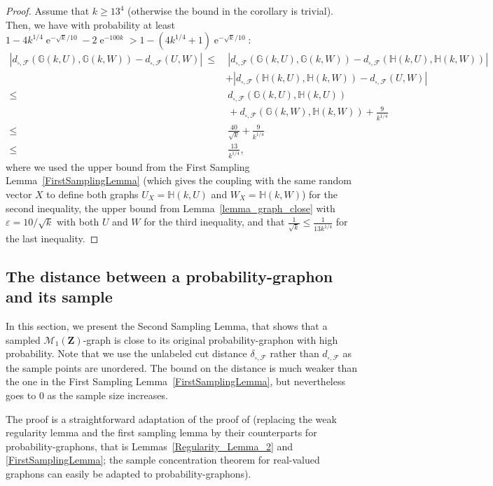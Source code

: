 \documentclass{amsart}
\theoremstyle{plain}
\theoremstyle{definition}
\newcommand{\Space}{\mathbf{Z}}
\newcommand{\bbH}{\mathbb{H}}
\newcommand{\Proba}{\mathcal{M}_1(\Space)}
\newcommand{\dcutF}{d_{\square,\mathcal{F}}}
\newcommand{\ddcutF}{\delta_{\square,\mathcal{F}}}
\newcommand{\eps}{\varepsilon}
\DeclareMathOperator{\e}{e}
\begin{document}
\begin{proof}
Assume that $k \geq 13^4$ (otherwise the bound in the corollary is trivial).
Then, we have with probability at least $1 - 4k^{1/4}\e^{-\sqrt{k}/10} - 2\e^{-100 k}
> 1 - (4k^{1/4}+1)\e^{-\sqrt{k}/10}$:
\begin{align}
\left| \dcutF(\mathbb{G}(k,U), \mathbb{G}(k,W)) - \dcutF(U,W) \right| 
\ \leq & \ \left| \dcutF(\mathbb{G}(k,U), \mathbb{G}(k,W)) - \dcutF(\mathbb{H}(k,U), \mathbb{H}(k,W)) \right| 
\nonumber \\
& + \left| \dcutF(\mathbb{H}(k,U), \mathbb{H}(k,W)) - \dcutF(U,W) \right|
\nonumber \\
\leq & \  \dcutF(\mathbb{G}(k,U), \mathbb{H}(k,U))  \nonumber \\
& \ + \dcutF(\mathbb{G}(k,W), \mathbb{H}(k,W)) + \frac{9}{k^{1/4}}
\nonumber \\
\leq & \  \frac{40}{\sqrt{k}} + \frac{9}{k^{1/4}}	  \nonumber \\
\leq & \  \frac{13}{k^{1/4}}	, \nonumber
\end{align}
where we used 
the upper bound from the First Sampling Lemma~\ref{FirstSamplingLemma} 
(which gives the coupling with the same random vector $X$ to define both graphs
	$U_X = \bbH(k,U)$ and $W_X = \bbH(k,W)$)
for the second inequality,
the upper bound from Lemma~\ref{lemma_graph_close} with $\eps = 10 / \sqrt{k}$
	with both $U$ and $W$
for the third inequality,
and that $\frac{1}{\sqrt{k}} \leq \frac{1}{13 k^{1/4}}$
for the last inequality.
\end{proof}



\subsection{The distance between a probability-graphon and its sample}

In this section, we present  the Second Sampling Lemma,
that shows that a sampled $\Proba$-graph is close to 
its original probability-graphon with high probability.
Note that we use the unlabeled cut distance $\ddcutF$ rather than $\dcutF$
as the sample points  are unordered.
The bound on the distance is much weaker than the one in the
First Sampling Lemma~\ref{FirstSamplingLemma}, 
but nevertheless goes to $0$ as the sample size increases.

The proof is a straightforward adaptation of the proof of \cite[Lemma 10.16]{Lovasz}
	(replacing the weak regularity lemma and the first sampling lemma
		by their counterparts for probability-graphons,
		that is Lemmas~\ref{Regularity_Lemma_2} and \ref{FirstSamplingLemma};
	the sample concentration theorem for real-valued graphons can easily be adapted
		to probability-graphons).
\end{document}
